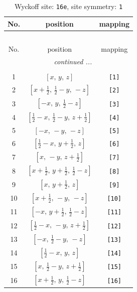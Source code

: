 \documentclass[fleqn,8pt]{jsarticle}
\begin{document}
\begin{longtable}{ccc}
\caption{Wyckoff site: {\tt 16e}, site symmetry: {\tt 1}}
 \\
 \hline \hline
No. & position & mapping \\ \hline \endfirsthead

\multicolumn{2}{l}{\tablename\ \thetable{}} \\
 \hline \hline
No. & position & mapping \\ \hline \endhead

 \hline \hline
\multicolumn{2}{r}{\footnotesize\it continued ...} \\ \endfoot

 \hline \hline
\multicolumn{2}{r}{} \\ \endlastfoot

1 & $\left[ x,\, y,\, z \right]$ & {\tt [1]} \\ \hline
2 & $\left[ x + \frac{1}{2},\, \frac{1}{2} - y,\, - z \right]$ & {\tt [2]} \\ \hline
3 & $\left[ - x,\, y,\, \frac{1}{2} - z \right]$ & {\tt [3]} \\ \hline
4 & $\left[ \frac{1}{2} - x,\, \frac{1}{2} - y,\, z + \frac{1}{2} \right]$ & {\tt [4]} \\ \hline
5 & $\left[ - x,\, - y,\, - z \right]$ & {\tt [5]} \\ \hline
6 & $\left[ \frac{1}{2} - x,\, y + \frac{1}{2},\, z \right]$ & {\tt [6]} \\ \hline
7 & $\left[ x,\, - y,\, z + \frac{1}{2} \right]$ & {\tt [7]} \\ \hline
8 & $\left[ x + \frac{1}{2},\, y + \frac{1}{2},\, \frac{1}{2} - z \right]$ & {\tt [8]} \\ \hline
9 & $\left[ x,\, y + \frac{1}{2},\, z \right]$ & {\tt [9]} \\ \hline
10 & $\left[ x + \frac{1}{2},\, - y,\, - z \right]$ & {\tt [10]} \\ \hline
11 & $\left[ - x,\, y + \frac{1}{2},\, \frac{1}{2} - z \right]$ & {\tt [11]} \\ \hline
12 & $\left[ \frac{1}{2} - x,\, - y,\, z + \frac{1}{2} \right]$ & {\tt [12]} \\ \hline
13 & $\left[ - x,\, \frac{1}{2} - y,\, - z \right]$ & {\tt [13]} \\ \hline
14 & $\left[ \frac{1}{2} - x,\, y,\, z \right]$ & {\tt [14]} \\ \hline
15 & $\left[ x,\, \frac{1}{2} - y,\, z + \frac{1}{2} \right]$ & {\tt [15]} \\ \hline
16 & $\left[ x + \frac{1}{2},\, y,\, \frac{1}{2} - z \right]$ & {\tt [16]} \\
\end{longtable}
\end{document}

